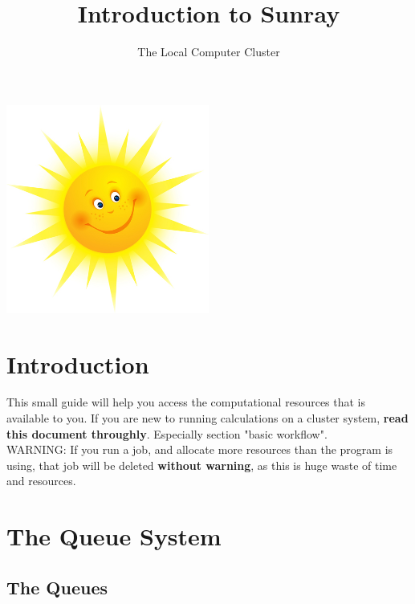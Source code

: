 \documentclass{article}
\title{Introduction to Sunray}
\author{The Local Computer Cluster}
\date{}
\begin{document}

\maketitle

\begin{center}
    \includegraphics[width=0.5\textwidth]{sun}
\end{center}

\tableofcontents


\newpage


\section{Introduction}

This small guide will help you access the computational resources that is available to you.
If you are new to running calculations on a cluster system, {\bf read this document throughly}. Especially section "basic workflow".\\

WARNING: If you run a job, and allocate more resources than the program is using, that job will be deleted {\bf without warning}, as this is huge waste of time and resources.\\


\newpage
\section{The Queue System}

\subsection*{The Queues}
\end{document}
